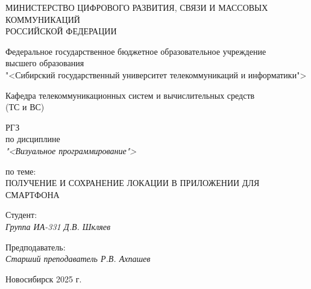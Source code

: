 \thispagestyle{empty}

\begin{center}
    МИНИСТЕРСТВО ЦИФРОВОГО РАЗВИТИЯ, СВЯЗИ И МАССОВЫХ КОММУНИКАЦИЙ \\ РОССИЙСКОЙ ФЕДЕРАЦИИ

    \vspace{20pt}

    Федеральное государственное бюджетное образовательное учреждение  \\  высшего образования \\
    "<Сибирский государственный университет телекоммуникаций и информатики"> \\

    \vspace{20pt}

    Кафедра телекоммуникационных систем и вычислительных средств\\  (ТС и ВС)
\end{center}

\vfill

\begin{center}
    РГЗ \\  
    по дисциплине \\
    \textit{"<Визуальное программирование">}

    \vspace{20pt}

    по теме: \\
    \uppercase{Получение и сохранение локации в приложении для смартфона}
\end{center}

\vfill

    \noindent Студент: \\
    \textit{Группа ИА-331 \hfill Д.В. Шкляев}

    \vspace{20pt}

    \noindent Предподаватель: \\
    \textit{Старший преподаватель \hfill Р.В. Ахпашев}

\vfill

\begin{center}
    Новосибирск 2025 г.
\end{center}